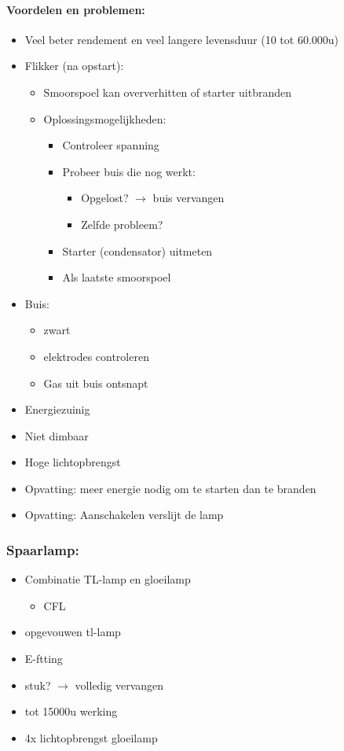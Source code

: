 \documentclass[12pt]{article}
\begin{document}
\paragraph{Voordelen en problemen:}
\begin{itemize}
    \item Veel beter rendement en veel langere levensduur (10 tot 60.000u)
    \item Flikker (na opstart):\begin{itemize}
        \item Smoorspoel kan oververhitten of starter uitbranden
        \item Oplossingsmogelijkheden:\begin{itemize}
            \item Controleer spanning
            \item Probeer buis die nog werkt:\begin{itemize}
                \item Opgelost? $\rightarrow$ buis vervangen
                \item Zelfde probleem?
            \end{itemize}
            \item Starter (condensator) uitmeten
            \item Als laatste smoorspoel
        \end{itemize}
    \end{itemize}
    \item Buis:\begin{itemize}
        \item zwart 
        \item elektrodes controleren 
        \item Gas uit buis ontsnapt
    \end{itemize}
    \item Energiezuinig 
    \item Niet dimbaar 
    \item Hoge lichtopbrengst
    \item Opvatting: meer energie nodig om te starten dan te branden 
    \item Opvatting: Aanschakelen verslijt de lamp
\end{itemize}
\subsubsection{Spaarlamp:}
\begin{itemize}
    \item Combinatie TL-lamp en gloeilamp\begin{itemize}
        \item CFL
    \end{itemize}
    \item opgevouwen tl-lamp
    \item E-ftting 
    \item stuk? $\rightarrow$ volledig vervangen 
    \item tot 15000u werking 
    \item 4x lichtopbrengst gloeilamp
\end{itemize}
\end{document}
